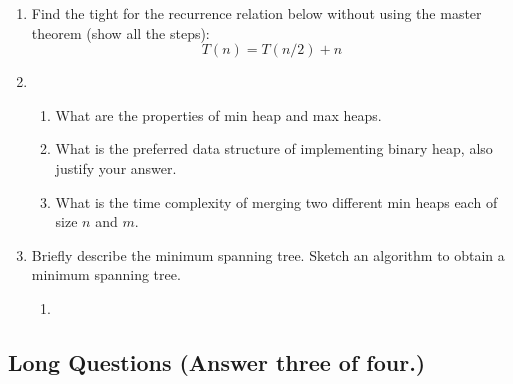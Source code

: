 \begin{enumerate}
	
	\item Find the tight for the recurrence relation below without using the master theorem (show all the steps):
	$$T(n) = T(n/2) + n$$
	
	
	\item	\begin{enumerate}[label=\alph*.]
		\item What are the properties of min heap and max heaps.
		\item What is the preferred data structure of implementing binary heap, also justify your answer.
		\item What is the time complexity of merging two different min heaps each of size $n$ and $m$.
	\end{enumerate}
	

	\item Briefly describe the minimum spanning tree.  Sketch an algorithm to obtain a minimum spanning tree.
	

	\begin{enumerate}[label=\alph*.]
		\item
	\end{enumerate}

\end{enumerate}

\subsection{Long Questions (Answer three of four.)}

